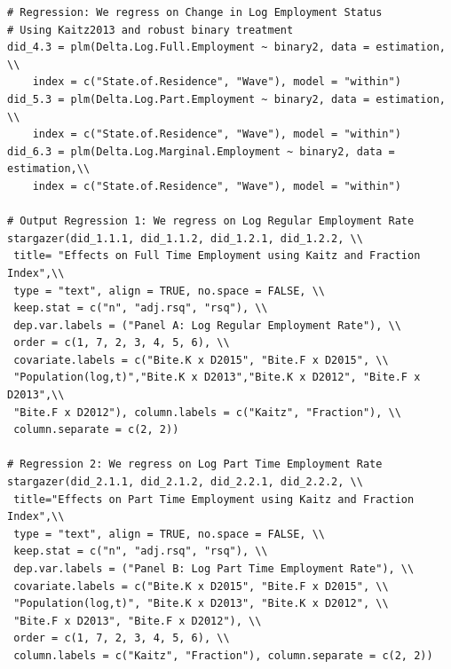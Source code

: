 \documentclass[a4paper]{article}
\begin{document}
{\begin{lstlisting}
# Regression: We regress on Change in Log Employment Status 
# Using Kaitz2013 and robust binary treatment
did_4.3 = plm(Delta.Log.Full.Employment ~ binary2, data = estimation, \\ 
	index = c("State.of.Residence", "Wave"), model = "within")
did_5.3 = plm(Delta.Log.Part.Employment ~ binary2, data = estimation, \\ 
	index = c("State.of.Residence", "Wave"), model = "within")
did_6.3 = plm(Delta.Log.Marginal.Employment ~ binary2, data = estimation,\\ 
	index = c("State.of.Residence", "Wave"), model = "within")

# Output Regression 1: We regress on Log Regular Employment Rate
stargazer(did_1.1.1, did_1.1.2, did_1.2.1, did_1.2.2, \\ 
 title= "Effects on Full Time Employment using Kaitz and Fraction Index",\\
 type = "text", align = TRUE, no.space = FALSE, \\ 
 keep.stat = c("n", "adj.rsq", "rsq"), \\ 
 dep.var.labels = ("Panel A: Log Regular Employment Rate"), \\ 
 order = c(1, 7, 2, 3, 4, 5, 6), \\ 
 covariate.labels = c("Bite.K x D2015", "Bite.F x D2015", \\
 "Population(log,t)","Bite.K x D2013","Bite.K x D2012", "Bite.F x D2013",\\ 
 "Bite.F x D2012"), column.labels = c("Kaitz", "Fraction"), \\ 
 column.separate = c(2, 2))

# Regression 2: We regress on Log Part Time Employment Rate
stargazer(did_2.1.1, did_2.1.2, did_2.2.1, did_2.2.2, \\ 
 title="Effects on Part Time Employment using Kaitz and Fraction Index",\\ 
 type = "text", align = TRUE, no.space = FALSE, \\ 
 keep.stat = c("n", "adj.rsq", "rsq"), \\ 
 dep.var.labels = ("Panel B: Log Part Time Employment Rate"), \\ 
 covariate.labels = c("Bite.K x D2015", "Bite.F x D2015", \\ 
 "Population(log,t)", "Bite.K x D2013", "Bite.K x D2012", \\ 
 "Bite.F x D2013", "Bite.F x D2012"), \\ 
 order = c(1, 7, 2, 3, 4, 5, 6), \\ 
 column.labels = c("Kaitz", "Fraction"), column.separate = c(2, 2))


\end{lstlisting}}
\end{document}
